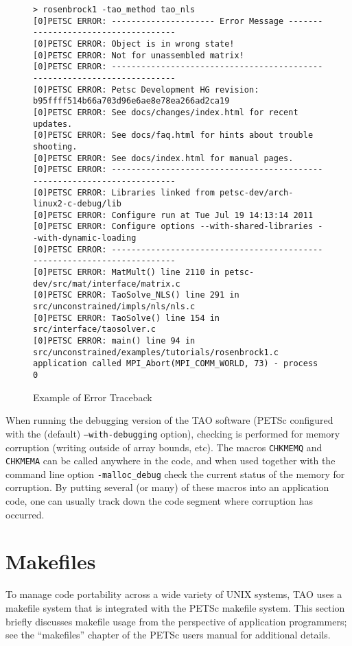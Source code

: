 \begin{figure}[htb]
{\footnotesize
\begin{verbatim}
> rosenbrock1 -tao_method tao_nls
[0]PETSC ERROR: --------------------- Error Message ------------------------------------
[0]PETSC ERROR: Object is in wrong state!
[0]PETSC ERROR: Not for unassembled matrix!
[0]PETSC ERROR: ------------------------------------------------------------------------
[0]PETSC ERROR: Petsc Development HG revision: b95ffff514b66a703d96e6ae8e78ea266ad2ca19
[0]PETSC ERROR: See docs/changes/index.html for recent updates.
[0]PETSC ERROR: See docs/faq.html for hints about trouble shooting.
[0]PETSC ERROR: See docs/index.html for manual pages.
[0]PETSC ERROR: ------------------------------------------------------------------------
[0]PETSC ERROR: Libraries linked from petsc-dev/arch-linux2-c-debug/lib
[0]PETSC ERROR: Configure run at Tue Jul 19 14:13:14 2011
[0]PETSC ERROR: Configure options --with-shared-libraries --with-dynamic-loading
[0]PETSC ERROR: ------------------------------------------------------------------------
[0]PETSC ERROR: MatMult() line 2110 in petsc-dev/src/mat/interface/matrix.c
[0]PETSC ERROR: TaoSolve_NLS() line 291 in src/unconstrained/impls/nls/nls.c
[0]PETSC ERROR: TaoSolve() line 154 in src/interface/taosolver.c
[0]PETSC ERROR: main() line 94 in src/unconstrained/examples/tutorials/rosenbrock1.c
application called MPI_Abort(MPI_COMM_WORLD, 73) - process 0
\end{verbatim}
}
\caption{Example of Error Traceback}
\label{fig:traceback}
\end{figure}

When running the debugging version of the TAO software (PETSc configured 
with the (default) \texttt{--with-debugging} option), checking is performed for 
memory corruption
(writing outside of array bounds, etc). The macros \texttt{CHKMEMQ} and
\texttt{CHKMEMA} can be called anywhere in the code, and when used together 
with the command line option \texttt{-malloc\_debug} check the current
status of the memory for corruption.  By putting several (or many) of
these macros into an application code, one can usually track
down the code segment where corruption has occurred.

\section{Makefiles}
\label{sec:makefiles}

To manage code portability across a wide variety of UNIX systems, TAO
uses a makefile system that is integrated with the PETSc makefile system.  This
section briefly discusses makefile usage from the perspective of
application programmers; see the ``makefiles'' chapter of the PETSc
users manual for additional details.

